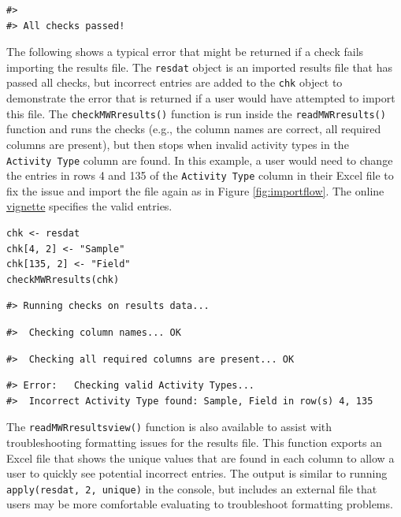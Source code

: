 \begin{verbatim}
#> 
#> All checks passed!
\end{verbatim}

The following shows a typical error that might be returned if a check fails importing the results file. The \texttt{resdat} object is an imported results file that has passed all checks, but incorrect entries are added to the \texttt{chk} object to demonstrate the error that is returned if a user would have attempted to import this file. The \texttt{checkMWRresults()} function is run inside the \texttt{readMWRresults()} function and runs the checks (e.g., the column names are correct, all required columns are present), but then stops when invalid activity types in the \texttt{Activity\ Type} column are found. In this example, a user would need to change the entries in rows 4 and 135 of the \texttt{Activity\ Type} column in their Excel file to fix the issue and import the file again as in Figure \ref{fig:importflow}. The online \href{https://massbays-tech.github.io/MassWateR/articles/inputs.html\#data-import-and-checks}{vignette} specifies the valid entries.

\begin{verbatim}
chk <- resdat
chk[4, 2] <- "Sample"
chk[135, 2] <- "Field"
checkMWRresults(chk)
\end{verbatim}

\begin{verbatim}
#> Running checks on results data...
\end{verbatim}

\begin{verbatim}
#>  Checking column names... OK
\end{verbatim}

\begin{verbatim}
#>  Checking all required columns are present... OK
\end{verbatim}

\begin{verbatim}
#> Error:   Checking valid Activity Types...
#>  Incorrect Activity Type found: Sample, Field in row(s) 4, 135
\end{verbatim}

The \texttt{readMWRresultsview()} function is also available to assist with troubleshooting formatting issues for the results file. This function exports an Excel file that shows the unique values that are found in each column to allow a user to quickly see potential incorrect entries. The output is similar to running \texttt{apply(resdat,\ 2,\ unique)} in the console, but includes an external file that users may be more comfortable evaluating to troubleshoot formatting problems.

